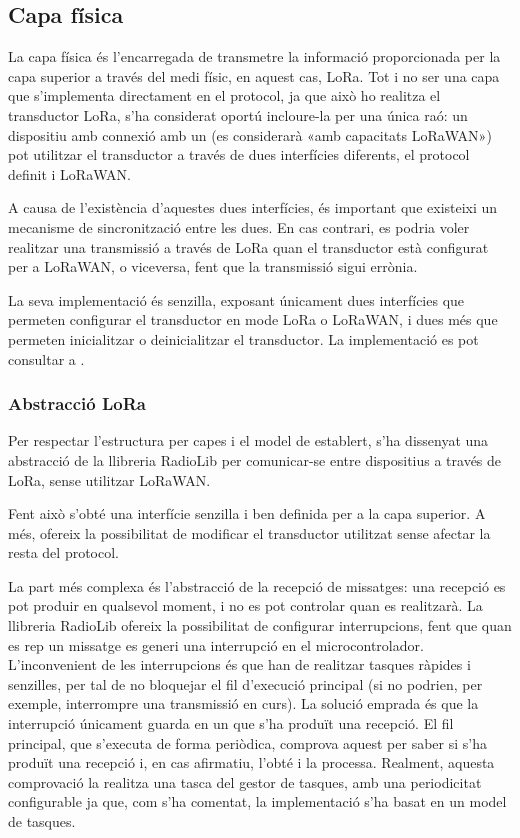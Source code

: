 \documentclass{tfgitic}[2024/07/01]
\begin{document}
\subsection{Capa física}
La capa física és l'encarregada de transmetre la informació proporcionada per la capa superior a través del medi físic, en aquest cas, LoRa. Tot i no ser una capa que s'implementa directament en el protocol, ja que això ho realitza el transductor LoRa, s'ha considerat oportú incloure-la per una única raó: un dispositiu amb connexió amb un  (es considerarà «amb capacitats LoRaWAN») pot utilitzar el transductor a través de dues interfícies diferents, el protocol definit i LoRaWAN.

A causa de l'existència d'aquestes dues interfícies, és important que existeixi un mecanisme de sincronització entre les dues. En cas contrari, es podria voler realitzar una transmissió a través de LoRa quan el transductor està configurat per a LoRaWAN, o viceversa, fent que la transmissió sigui errònia.

La seva implementació és senzilla, exposant únicament dues interfícies que permeten configurar el transductor en mode LoRa o LoRaWAN, i dues més que permeten inicialitzar o deinicialitzar el transductor. La implementació es pot consultar a . 

\subsubsection{Abstracció LoRa}
Per respectar l'estructura per capes i el model de  establert, s'ha dissenyat una abstracció de la llibreria RadioLib per comunicar-se entre dispositius a través de LoRa, sense utilitzar LoRaWAN.

Fent això s'obté una interfície senzilla i ben definida per a la capa superior. A més, ofereix la possibilitat de modificar el transductor utilitzat sense afectar la resta del protocol. 

La part més complexa és l'abstracció de la recepció de missatges: una recepció es pot produir en qualsevol moment, i no es pot controlar quan es realitzarà. La llibreria RadioLib ofereix la possibilitat de configurar interrupcions, fent que quan es rep un missatge es generi una interrupció en el microcontrolador. L'inconvenient de les interrupcions és que han de realitzar tasques ràpides i senzilles, per tal de no bloquejar el fil d'execució principal (si no podrien, per exemple, interrompre una transmissió en curs). La solució emprada és que la interrupció únicament guarda en un  que s'ha produït una recepció. El fil principal, que s'executa de forma periòdica, comprova aquest  per saber si s'ha produït una recepció i, en cas afirmatiu, l'obté i la processa. Realment, aquesta comprovació la realitza una tasca del gestor de tasques, amb una periodicitat configurable ja que, com s'ha comentat, la implementació s'ha basat en un model de tasques.
\end{document}
